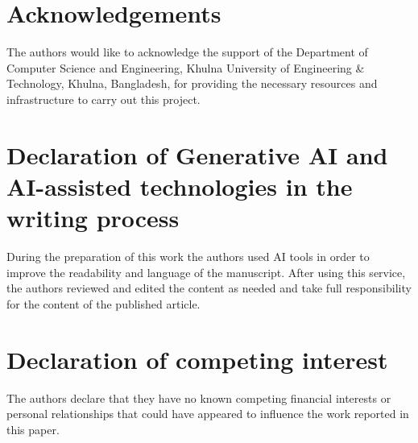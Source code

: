 \documentclass[preprint,12pt,a4paper]{elsarticle}
\begin{document}
\section*{Acknowledgements}
The authors would like to acknowledge the support of the Department of Computer Science and Engineering, Khulna University of Engineering \& Technology, Khulna, Bangladesh, for providing the necessary resources and infrastructure to carry out this project.

\section*{Declaration of Generative AI and AI-assisted technologies in the writing process}
During the preparation of this work the authors used AI tools in order to improve the readability and language of the manuscript. After using this service, the authors reviewed and edited the content as needed and take full responsibility for the content of the published article.

\section*{Declaration of competing interest}
The authors declare that they have no known competing financial interests or personal relationships that could have appeared to influence the work reported in this paper.
\end{document}
